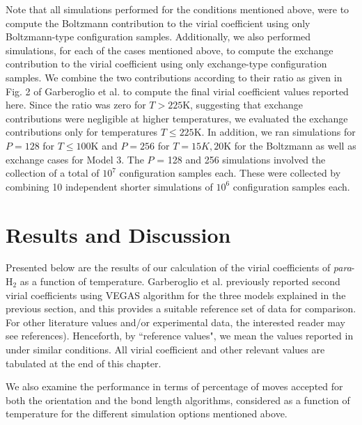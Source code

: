         Note that all simulations performed for the conditions mentioned above, were to compute the Boltzmann contribution to the virial coefficient using only Boltzmann-type configuration samples. Additionally, we also performed simulations, for each of the cases mentioned above, to compute the exchange contribution to the virial coefficient using only exchange-type configuration samples. We combine the two contributions according to their ratio as given in Fig. 2 of Garberoglio et al. \cite{Garberoglio2014} to compute the final virial coefficient values reported here. Since the ratio was zero for $T > 225$K, suggesting that exchange contributions were negligible at higher temperatures, we evaluated the exchange contributions only for temperatures $T \le 225$K. In addition, we ran simulations for $P = 128$ for $T \le 100$K and $P = 256$ for $T = 15K, 20$K for the Boltzmann as well as exchange cases for Model 3. The $P$ = 128 and 256 simulations involved the collection of a total of $10^7$ configuration samples each. These were collected by combining 10 independent shorter simulations of $10^6$ configuration samples each.

    \section{Results and Discussion}
    \label{sec:Results and discussion}
        Presented below are the results of our calculation of the virial coefficients of \emph{para}-H$_2$ as a function of temperature. Garberoglio et al.\cite{Garberoglio2014} previously reported second virial coefficients using VEGAS\cite{Lepage1972} algorithm for the three models explained in the previous section, and this provides a suitable reference set of data for comparison. For other literature values and/or experimental data, the interested reader may see references\cite{Goodwin1963, Patkowski2008, Leachman2009, Sakoda2012, Garberoglio2012, Garberoglio2014}). Henceforth, by ``reference values", we mean the values reported in \cite{Garberoglio2014} under similar conditions. All virial coefficient and other relevant values are tabulated at the end of this chapter.

        We also examine the performance in terms of percentage of moves accepted for both the orientation and the bond length algorithms, considered as a function of temperature for the different simulation options mentioned above.

